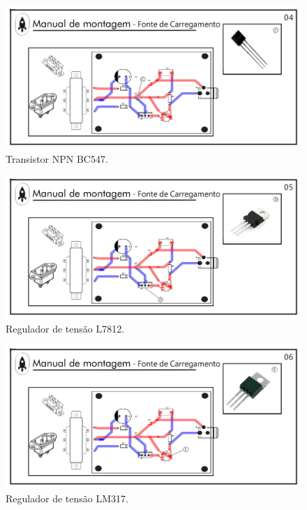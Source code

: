 \begin{figure}[H]
  \centering
  \includegraphics[width=\textwidth]{Figuras/Carregador/carregador_manual_04.jpg}
  \caption{Transistor NPN BC547.} 
  \label{carregador04}
\end{figure}

\begin{figure}[H]
  \centering
  \includegraphics[width=\textwidth]{Figuras/Carregador/carregador_manual_05.jpg}
  \caption{ Regulador de tensão L7812.} 
  \label{carregador05}
\end{figure}

\begin{figure}[H]
  \centering
  \includegraphics[width=\textwidth]{Figuras/Carregador/carregador_manual_06.jpg}
  \caption{ Regulador de tensão LM317.} 
  \label{carregador06}
\end{figure}


